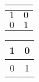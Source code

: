 \begin{table}[!tbp]
\begin{center}
\begin{tabular}{rr}
\hline\hline
\multicolumn{1}{c}{}&\multicolumn{1}{c}{}\tabularnewline
\hline
$1$&$0$\tabularnewline
$0$&$1$\tabularnewline
\hline
\end{tabular}\end{center}
\end{table}
\begin{tabular} {|c |c |}  
 \hline 
1 & 0 \\ \hline 
0 & 1 \\ \hline 
\end{tabular}
